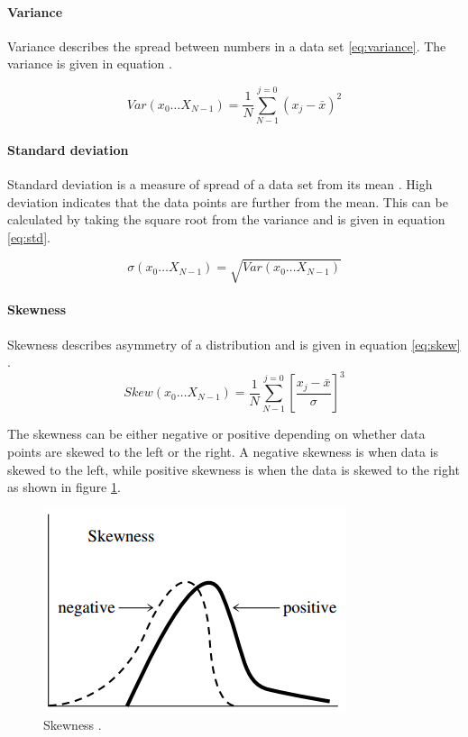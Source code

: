 \documentclass[USenglish]{ifimaster}  %
\begin{document}
	
\paragraph{Variance}
Variance describes the spread between numbers in a data set \ref{eq:variance}. The variance is given in equation \cite{Press:2007:NRE:1403886}.
	
\begin{equation}
Var(x_0\dotsc X_{N-1})  = \frac{1}{N}\sum_{N-1}^{j=0}(x_{j}-\bar{x})^2
\label{eq:variance}
\end{equation}

\paragraph{Standard deviation}
Standard deviation is a measure of spread of a data set from its mean \cite{Press:2007:NRE:1403886}. High deviation indicates that the data points are further from the mean. This can be calculated by taking the square root from the variance and is given in equation \ref{eq:std}.
	
	\begin{equation}
	\sigma(x_0\dotsc X_{N-1})  = \sqrt{Var(x_0\dotsc X_{N-1})}
	\label{eq:std}
	\end{equation}
	
\paragraph{Skewness} 
Skewness describes asymmetry of a distribution and is given in equation \ref{eq:skew} \cite{Press:2007:NRE:1403886}.
	\begin{equation}
	Skew(x_0\dotsc X_{N-1})  =  \frac{1}{N}\sum_{N-1}^{j=0}\left [ \frac{x_j-\bar{x}}{\sigma} \right ]^3
	\label{eq:skew}
	\end{equation}
	
The skewness can be either negative or positive depending on whether data points are skewed to the left or the right. A negative skewness is when data is skewed to the left, while positive skewness is when the data is skewed to the right as shown in figure \ref{fig:skew}.
	
	\begin{figure}[h]
		\centering
		\includegraphics[scale=0.8]{Figures/Skewness}
		\caption[Skewness]{Skewness \cite{Press:2007:NRE:1403886}.}
		\label{fig:skew}
	\end{figure}
	
\end{document}

